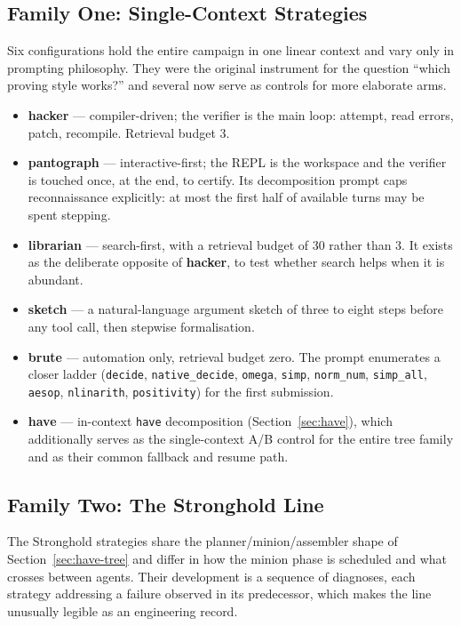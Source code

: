 \documentclass[12pt, a4paper]{article}
\begin{document}
\subsection{Family One: Single-Context Strategies}

Six configurations hold the entire campaign in one linear context and vary
only in prompting philosophy. They were the original instrument for the
question ``which proving style works?'' and several now serve as controls
for more elaborate arms.

\begin{itemize}[leftmargin=*]
  \item \textbf{hacker} --- compiler-driven; the verifier is the main loop:
    attempt, read errors, patch, recompile. Retrieval budget 3.
  \item \textbf{pantograph} --- interactive-first; the REPL is the workspace
    and the verifier is touched once, at the end, to certify. Its
    decomposition prompt caps reconnaissance explicitly: at most the first
    half of available turns may be spent stepping.
  \item \textbf{librarian} --- search-first, with a retrieval budget of 30
    rather than 3. It exists as the deliberate opposite of \textbf{hacker},
    to test whether search helps when it is abundant.
  \item \textbf{sketch} --- a natural-language argument sketch of three to
    eight steps before any tool call, then stepwise formalisation.
  \item \textbf{brute} --- automation only, retrieval budget zero. The
    prompt enumerates a closer ladder (\texttt{decide},
    \texttt{native\_decide}, \texttt{omega}, \texttt{simp},
    \texttt{norm\_num}, \texttt{simp\_all}, \texttt{aesop},
    \texttt{nlinarith}, \texttt{positivity}) for the first submission.
  \item \textbf{have} --- in-context \texttt{have} decomposition
    (Section~\ref{sec:have}), which additionally serves as the single-context
    A/B control for the entire tree family and as their common fallback and
    resume path.
\end{itemize}

\subsection{Family Two: The Stronghold Line}
\label{sec:stronghold}

The Stronghold strategies share the planner/minion/assembler shape of
Section~\ref{sec:have-tree} and differ in how the minion phase is scheduled
and what crosses between agents. Their development is a sequence of
diagnoses, each strategy addressing a failure observed in its predecessor,
which makes the line unusually legible as an engineering record.
\end{document}
